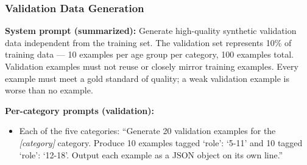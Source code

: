 \documentclass[journal]{IEEEtai}
\begin{document}
\subsubsection*{Validation Data Generation}

\noindent\textbf{System prompt (summarized):} Generate high-quality synthetic validation data independent from the training set. The validation set represents 10\% of training data --- 10 examples per age group per category, 100 examples total. Validation examples must not reuse or closely mirror training examples. Every example must meet a gold standard of quality; a weak validation example is worse than no example.

\noindent\textbf{Per-category prompts (validation):}
\begin{itemize}
  \item Each of the five categories: ``Generate 20 validation examples for the \textit{[category]} category. Produce 10 examples tagged `role': `5-11' and 10 tagged `role': `12-18'. Output each example as a JSON object on its own line.''
\end{itemize}
\end{document}
